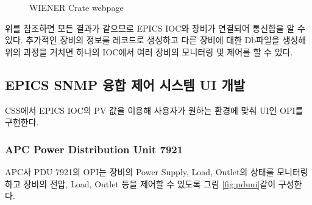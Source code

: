 \documentclass[11pt
  , a4paper
  , article
  , oneside
]{memoir}
\begin{document}
\begin{figure}[h!]
  \centering
              \hfill
              \hfill
  \caption
      {
WIENER Crate webpage
      }
 \label{fig:wienerweb}
\end{figure}


위를 참조하면 모든 결과가 같으므로 EPICS IOC와 장비가 연결되어 통신함을 알 수 있다. 추가적인 장비의 정보를 레코드로 생성하고 다른 장비에 대한 Db파일을 생성해 위의 과정을 거치면 하나의 IOC에서 여러 장비의 모니터링 및 제어를 할 수 있다.


\subsection{EPICS SNMP 융합 제어 시스템 UI 개발}

CSS에서 EPICS IOC의 PV 값을 이용해 사용자가 원하는 환경에 맞춰 UI인 OPI를 구현한다.  


\subsubsection{APC Power Distribution Unit 7921}

APC사 PDU 7921의 OPI는 장비의 Power Supply, Load, Outlet의 상태를 모니터링하고 장비의 전압, Load, Outlet 등을 제어할 수 있도록 그림 \ref{fig:pduui}같이 구성한다.
\end{document}
